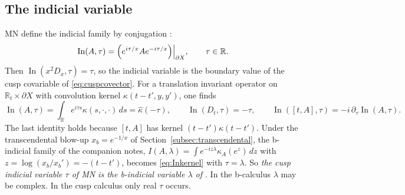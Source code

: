 \documentclass[11pt,oneside,reqno]{article}
\DeclareMathOperator{\In}{In}
\newcommand{\R}{\mathbb R}
\theoremstyle{plain}
\theoremstyle{definition}
\theoremstyle{remark}
\begin{document}
\subsection{The indicial variable}\label{subsec:indicialvariable}
MN define the indicial family by conjugation \cite[Def.~4]{MN}:
\begin{equation}\label{eq:Indef}
 \In(A,\tau)=\Bigl(e^{i\tau/x}Ae^{-i\tau/x}\Bigr)\Big|_{\partial X},
 \qquad\tau\in\R .
\end{equation}
Then \(\In(x^2D_x,\tau)=\tau\), so the indicial variable is the boundary
value of the cusp covariable of \eqref{eq:cuspcovector}. For a translation
invariant operator on \(\R_t\times\partial X\) with convolution kernel
\(\kappa(t-t',y,y')\), one finds
\begin{equation}\label{eq:Inkernel}
 \In(A,\tau)=\int_{\R}e^{i\tau s}\kappa(s,\cdot,\cdot)\,ds=\hat\kappa(-\tau),
 \qquad \In(D_t,\tau)=-\tau,\qquad
 \In([t,A],\tau)=-i\,\partial_\tau\In(A,\tau).
\end{equation}
The last identity holds because \([t,A]\) has kernel
\((t-t')\kappa(t-t')\). Under the transcendental blow-up \(x_b=e^{-1/x}\)
of Section~\ref{subsec:transcendental}, the b-indicial family of the
companion notes, \(I(A,\lambda)=\int e^{-iz\lambda}\kappa_A(e^z)\,dz\) with
\(z=\log(x_b/x_b')=-(t-t')\), becomes \eqref{eq:Inkernel} with
\(\tau=\lambda\). So \emph{the cusp indicial variable \(\tau\) of MN is
the b-indicial variable \(\lambda\) of \cite{Notes,HHb}}. In the b-calculus
\(\lambda\) may be complex. In the cusp calculus only real \(\tau\) occurs.
\end{document}
